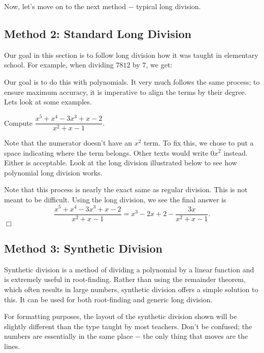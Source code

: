 \documentclass[../book.tex]{subfiles}
\begin{document}
Now, let's move on to the next method $-$ typical long division.
\subsection{Method 2: Standard Long Division}
\noindent Our goal in this section is to follow long division how it was taught in elementary school.  For example, when dividing $7812$ by $7$, we get:


\noindent Our goal is to do this with polynomials.  It very much follows the same process; to ensure maximum accuracy, it is imperative to align the terms by their degree.  Lets look at some examples.
\begin{example}
Compute $\dfrac{x^5+x^4-3x^3+x-2}{x^2+x-1}$.
\end{example}
\begin{solution}
Note that the numerator doesn't have an $x^2$ term.  To fix this, we chose to put a space indicating where the term belongs.  Other texts would write $0x^2$ instead.  Either is acceptable.  Look at the long division illustrated below to see how polynomial long division works.


\noindent Note that this process is nearly the exact same as regular division.  This is not meant to be difficult.  Using the long division, we see the final answer is $$\dfrac{x^5+x^4-3x^3+x-2}{x^2+x-1}=x^3-2x+2-\dfrac{3x}{x^2+x-1}.$$ $\Box$
\end{solution}
\subsection{Method 3: Synthetic Division}
\noindent Synthetic division is a method of dividing a polynomial by a linear function and is extremely useful in root-finding.  Rather than using the remainder theorem, which often results in large numbers, synthetic division offers a simple solution to this.  It can be used for both root-finding and generic long division.

For formatting purposes, the layout of the synthetic division shown will be slightly different than the type taught by most teachers.  Don't be confused; the numbers are essentially in the same place $-$ the only thing that moves are the lines.
\end{document}
